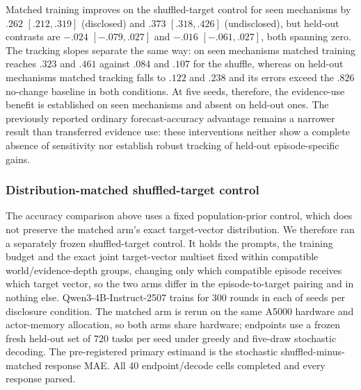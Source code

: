 \begin{table}[htbp]
\centering\footnotesize
\setlength{\tabcolsep}{3pt}
\resizebox{\linewidth}{!}{}
\caption{\textbf{Better gain tracking on seen mechanisms does not establish
transferred evidence use.} Entries are response-change MAE (lower is better);
trained entries average the five training seeds 42--46. No change is an
invariant predictor. Slope M and Slope S are matched and shuffled tracking
slopes (ideal 1, zero for no response to changed evidence). Positive
shuffled-minus-matched contrasts favor matched training. Both held-out
intervals include zero, and matched held-out errors exceed the no-change baseline.}
\label{tab:exp3-gain-evidence}
\end{table}

Matched training improves on the shuffled-target control for seen mechanisms
by $.262$ $[.212,.319]$ (disclosed) and $.373$ $[.318,.426]$ (undisclosed),
but held-out contrasts are $-.024$ $[-.079,.027]$ and $-.016$
$[-.061,.027]$, both spanning zero. The tracking slopes separate the same way:
on seen mechanisms matched training reaches $.323$ and $.461$ against $.084$
and $.107$ for the shuffle, whereas on held-out mechanisms matched tracking
falls to $.122$ and $.238$ and its errors exceed the $.826$ no-change baseline
in both conditions. At five seeds, therefore, the evidence-use benefit is
established on seen mechanisms and absent on held-out ones. The previously
reported ordinary forecast-accuracy advantage remains a narrower result than
transferred evidence use: these interventions neither show a complete absence
of sensitivity nor establish robust tracking of held-out episode-specific
gains.

\subsubsection{Distribution-matched shuffled-target control}
\label{app:exp3-shuffled-control}

The accuracy comparison above uses a fixed population-prior control, which does
not preserve the matched arm's exact target-vector distribution. We therefore
ran a separately frozen shuffled-target control. It holds the prompts, the
training budget and the exact joint target-vector multiset fixed within
compatible world/evidence-depth groups, changing only which compatible episode
receives which target vector, so the two arms differ in the episode-to-target
pairing and in nothing else. Qwen3-4B-Instruct-2507 trains for 300 rounds in
each of \eShufG{} seeds per disclosure condition. The matched arm is rerun on
the same A5000 hardware and actor-memory allocation, so both arms share
hardware; endpoints use a frozen fresh held-out set of 720 tasks per seed under
greedy and five-draw stochastic decoding. The pre-registered primary estimand
is the stochastic shuffled-minus-matched response MAE. All 40 endpoint/decode
cells completed and every response parsed.

